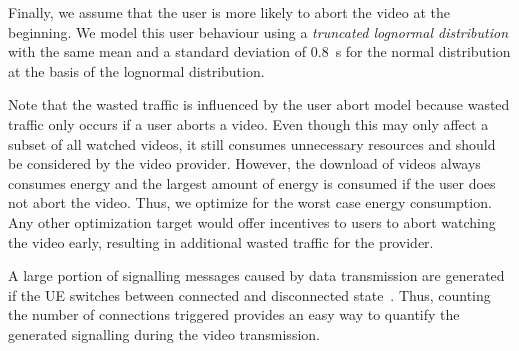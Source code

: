 Finally, we assume that the user is more likely to abort the video at the beginning.
We model this user behaviour using a \emph{truncated lognormal distribution} with the same mean and a standard deviation of \SI{0.8}{\second} for the normal distribution at the basis of the lognormal distribution.

Note that the wasted traffic \meanwastedtraffic is influenced by the user abort model because wasted traffic only occurs if a user aborts a video.
Even though this may only affect a subset of all watched videos, it still consumes unnecessary resources and should be considered by the video provider.
However, the download of videos always consumes energy and the largest amount of energy is consumed if the user does not abort the video.
Thus, we optimize for the worst case energy consumption.
Any other optimization target would offer incentives to users to abort watching the video early, resulting in additional wasted traffic for the provider.


A large portion of signalling messages caused by data transmission are generated if the \gls{UE} switches between connected and disconnected state~\cite{3GPP_RRC_Spec}.
Thus, counting the number of connections \connectioncount triggered provides an easy way to quantify the generated signalling during the video transmission.
